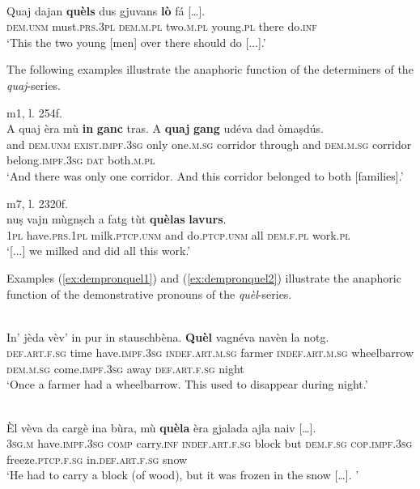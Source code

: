 \ea
\label{ex:quaj:anaph2}
\\
\gll Quaj dajan \textbf{quèls} dus gjuvans \textbf{lò} fá […].\\
    \textsc{dem.unm} must.\textsc{prs.3pl} \textsc{dem.m.pl} two.\textsc{m.pl} young.\textsc{pl} there do.\textsc{inf}\\
\glt `This the two young [men] over there should do [...].'
\z

The following examples illustrate the anaphoric function of the determiners of the \textit{quaj}-series.

\ea
\label{}
 {m1, l. 254f.}\\
\gll A quaj èra mù \textbf{in} \textbf{ganc} tras. A \textbf{quaj} \textbf{gang} udéva dad òmaṣdús.\\
and \textsc{dem.unm} \textsc{exist.impf.3sg} only one.\textsc{m.sg} corridor through and \textsc{dem.m.sg} corridor belong.\textsc{impf.3sg} \textsc{dat} both.\textsc{m.pl}\\
\glt ‘And there was only one corridor. And this corridor belonged to both [families].’
\z

\ea
\label{}
 {m7, l. 2320f.}\\
\gll [...] nuṣ vajn mùgnṣch a fatg tùt \textbf{quèlas} \textbf{lavurs}.\\
{} \textsc{1pl} have.\textsc{prs.1pl} milk.\textsc{ptcp.unm} and do.\textsc{ptcp.unm} all \textsc{dem.f.pl} work.\textsc{pl}\\
\glt `[...] we milked and did all this work.'
\z

Examples (\ref{ex:dempronquel1}) and (\ref{ex:dempronquel2}) illustrate the anaphoric function of the demonstrative pronouns of the \textit{quèl}-series.

\ea
\label{ex:dempronquel1}
\\
\gll    In' jèda vèv’ in pur in stauschbèna. \textbf{Quèl} vagnéva navèn la notg.\\
     \textsc{def.art.f.sg} time have.\textsc{impf.3sg} \textsc{indef.art.m.sg} farmer \textsc{indef.art.m.sg} wheelbarrow \textsc{dem.m.sg} come.\textsc{impf.3sg} away \textsc{def.art.f.sg} night\\
\glt `Once a farmer had a wheelbarrow. This used to disappear during night.'
\z

\ea\label{ex:dempronquel2}
\\
\gll    Èl vèva da cargè ina bùra, mù \textbf{quèla} èra gjalada ajla naiv […].\\
    \textsc{3sg.m} have.\textsc{impf.3sg} \textsc{comp} carry.\textsc{inf} \textsc{indef.art.f.sg} block but \textsc{dem.f.sg} \textsc{cop.impf.3sg} freeze.\textsc{ptcp.f.sg} in.\textsc{def.art.f.sg} snow\\
\glt `He had to carry a block (of wood), but it was frozen in the snow […]. '
\z

